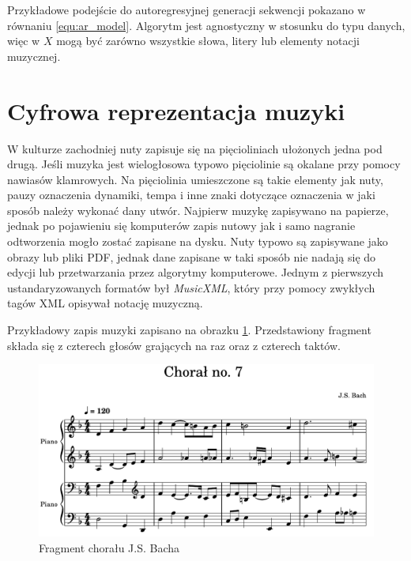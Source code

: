 \documentclass[data-science]{agh-wi} %
\begin{document}
Przykładowe podejście do autoregresyjnej generacji sekwencji pokazano w równaniu \ref*{equ:ar_model}. Algorytm jest agnostyczny w stosunku do typu danych, więc w $X$ mogą być zarówno wszystkie słowa, litery lub elementy notacji muzycznej.

\section{Cyfrowa reprezentacja muzyki}\label{sec:muzyka_cyfrowa}
W kulturze zachodniej nuty zapisuje się na pięcioliniach ułożonych jedna pod drugą. Jeśli muzyka jest wielogłosowa typowo pięciolinie są okalane przy pomocy nawiasów klamrowych. Na pięciolinia umieszczone są takie elementy jak nuty, pauzy oznaczenia dynamiki, tempa i inne znaki dotyczące oznaczenia w jaki sposób należy wykonać dany utwór. Najpierw muzykę zapisywano na papierze, jednak po pojawieniu się komputerów zapis nutowy jak i samo nagranie odtworzenia mogło zostać zapisane na dysku. Nuty typowo są zapisywane jako obrazy lub pliki PDF, jednak dane zapisane w taki sposób nie nadają się do edycji lub przetwarzania przez algorytmy komputerowe. Jednym z pierwszych ustandaryzowanych formatów był \textit{MusicXML}, który przy pomocy zwykłych tagów XML opisywał notację muzyczną.

Przykładowy zapis muzyki zapisano na obrazku \ref*{fig:jsb_sheet}. Przedstawiony fragment składa się z czterech głosów grających na raz oraz z czterech taktów.

\begin{figure}
    \begin{center}
        \includegraphics[width=0.9\linewidth]{./img/jsb_7_sheet.pdf}
    \end{center}
    \caption{Fragment chorału J.S. Bacha}\label{fig:jsb_sheet}
\end{figure}
\end{document}
